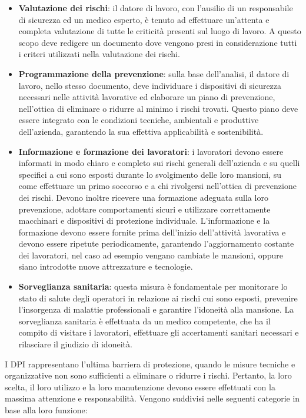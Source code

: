 \begin{itemize}
    \item \textbf{Valutazione dei rischi}: il datore di lavoro, con l'ausilio di un responsabile di sicurezza ed un medico esperto, è tenuto ad effettuare un'attenta e completa valutazione di tutte le criticità presenti sul luogo di lavoro. A questo scopo deve redigere un documento dove vengono presi in considerazione tutti i criteri utilizzati nella valutazione dei rischi.
    \item \textbf{Programmazione della prevenzione}: sulla base dell'analisi, il datore di lavoro, nello stesso documento, deve individuare i dispositivi di sicurezza necessari nelle attività lavorative ed elaborare un piano di prevenzione, nell'ottica di eliminare o ridurre al minimo i rischi trovati. Questo piano deve essere integrato con le condizioni tecniche, ambientali e produttive dell'azienda, garantendo la sua effettiva applicabilità e sostenibilità.
    \item \textbf{Informazione e formazione dei lavoratori}: i lavoratori devono essere informati in modo chiaro e completo sui rischi generali dell'azienda e su quelli specifici a cui sono esposti durante lo svolgimento delle loro mansioni, su come effettuare un primo soccorso e a chi rivolgersi nell'ottica di prevenzione dei rischi. Devono inoltre ricevere una formazione adeguata sulla loro prevenzione, adottare comportamenti sicuri e utilizzare correttamente macchinari e dispositivi di protezione individuale. L'informazione e la formazione devono essere fornite prima dell'inizio dell'attività lavorativa e devono essere ripetute periodicamente, garantendo l'aggiornamento costante dei lavoratori, nel caso ad esempio vengano cambiate le mansioni, oppure siano introdotte nuove attrezzature e tecnologie.
    \item \textbf{Sorveglianza sanitaria}: questa misura è fondamentale per monitorare lo stato di salute degli operatori in relazione ai rischi cui sono esposti, prevenire l'insorgenza di malattie professionali e garantire l'idoneità alla mansione. La sorveglianza sanitaria è effettuata da un medico competente, che ha il compito di visitare i lavoratori, effettuare gli accertamenti sanitari necessari e rilasciare il giudizio di idoneità.
\end{itemize}




\noindent I DPI rappresentano l'ultima barriera di protezione, quando le misure tecniche e organizzative non sono sufficienti a eliminare o ridurre i rischi. Pertanto, la loro scelta, il loro utilizzo e la loro manutenzione devono essere effettuati con la massima attenzione e responsabilità. Vengono suddivisi nelle seguenti categorie in base alla loro funzione:

